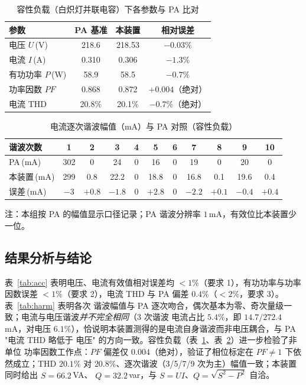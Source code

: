 \documentclass[12pt]{article}
\newcommand{\wuhao}{\fontsize{10.5pt}{15pt}\selectfont}
\begin{document}
\begin{table}[htbp]\centering
\caption{容性负载（白炽灯并联电容）下各参数与 PA 比对}
\label{tab:cap}
\wuhao
\begin{tabular}{lccc}
\toprule
参数 & PA 基准 & 本装置 & 相对误差\\
\midrule
电压 $U$\,(V)      & 218.6  & 218.53 & $-0.03\%$\\
电流 $I$\,(A)      & 0.310  & 0.306  & $-1.3\%$\\
有功功率 $P$\,(W)  & 58.9   & 58.5   & $-0.7\%$\\
功率因数 $PF$      & 0.868  & 0.872  & $+0.004$（绝对）\\
电流 THD          & 20.8\% & 20.1\% & $-0.7\%$（绝对）\\
\bottomrule
\end{tabular}
\end{table}

\begin{table}[htbp]\centering
\caption{电流逐次谐波幅值（mA）与 PA 对照（容性负载）}
\label{tab:capharm}
\wuhao
\begin{tabular}{lcccccccccc}
\toprule
谐波次数 & 1 & 2 & 3 & 4 & 5 & 6 & 7 & 8 & 9 & 10\\
\midrule
PA\,(mA)    & 302 & 0   & 24   & 0 & 16   & 0 & 19   & 0   & 20   & 0\\
本装置\,(mA) & 299 & 0.8 & 22.2 & 0 & 18.8 & 0 & 16.8 & 0.1 & 19.6 & 0.4\\
误差\,(mA)   & $-3$ & $+0.8$ & $-1.8$ & 0 & $+2.8$ & 0 & $-2.2$ & $+0.1$ & $-0.4$ & $+0.4$\\
\bottomrule
\end{tabular}

\vspace{2pt}
{\wuhao 注：本组按 PA 的幅值显示口径记录；PA 谐波分辨率 $1$\,mA，有效位比本装置少一位。}
\end{table}

\subsection{结果分析与结论}
表~\ref{tab:acc} 表明电压、电流有效值相对误差均 $<1\%$（要求 1），有功功率与功率因数误差
$<1\%$（要求 2），电流 THD 与 PA 偏差 $0.4\%$（$<2\%$，要求 3）。表~\ref{tab:harm} 表明各次
谐波幅值与 PA 逐次吻合，偶次基本为零、奇次量级一致；电流与电压谐波\emph{并不完全相同}（3 次谐波
电流占比 $5.4\%$，即 $14.7/272.4$\,mA，对电压 $6.1\%$），恰说明本装置测得的是电流自身谐波而非电压耦合，与 PA "电流 THD 略低于
电压" 的方向一致。容性负载（表~\ref{tab:cap}、表~\ref{tab:capharm}）进一步检验了非单位
功率因数工作点：$PF$ 偏差仅 $0.004$（绝对），验证了相位标定在 $PF\ne 1$ 下依然成立；THD
$20.1\%$ 对 $20.8\%$、逐次谐波（3/5/7/9 次为主）幅值一致；本装置同时给出 $S=66.2$\,VA、
$Q=32.2$\,var，与 $S=UI$、$Q=\sqrt{S^2-P^2}$ 自洽。
\end{document}
